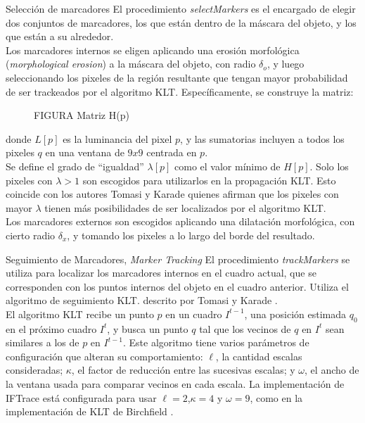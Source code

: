 \documentclass[a4paper,10pt]{article}
\begin{document}
Selección de marcadores
El procedimiento \textit{selectMarkers} es el encargado de elegir dos conjuntos 
de marcadores, los que están dentro de la máscara del objeto, y los que están a
su alrededor.\\

Los marcadores internos se eligen aplicando una erosión morfológica 
(\textit{morphological erosion}) a la máscara del objeto, con radio $\delta_{o}$, y 
luego seleccionando los pixeles de la región resultante que tengan mayor probabilidad
de ser trackeados por el algoritmo KLT. Específicamente, se construye la matriz:

 \begin{figure}[H]
        \caption{FIGURA Matriz H(p)}
        \label{fig:IFTrace-matrix-H}
\end{figure}

donde $L[p]$ es la luminancia del pixel $p$, y las sumatorias incluyen a todos los
pixeles $q$ en una ventana de $9x9$ centrada en $p$.\\
Se define el grado de ``igualdad'' $\lambda[p]$ como el valor mínimo de $H[p]$. 
Solo los pixeles con $\lambda > 1$ son escogidos para utilizarlos en la 
propagación KLT. Esto coincide con los autores Tomasi y Karade \cite{Tomasi91detectionand}
quienes afirman que los pixeles con mayor $\lambda$ tienen más posibilidades
de ser localizados por el algoritmo KLT.\\
Los marcadores externos son escogidos aplicando una dilatación morfológica, con 
cierto radio $\delta_{x}$, y tomando los pixeles a lo largo del borde del resultado.

Seguimiento de Marcadores, \textit{Marker Tracking}
El procedimiento \textit{trackMarkers} se utiliza para localizar los marcadores 
internos en el cuadro actual, que se corresponden con los puntos internos del objeto
en el cuadro anterior. Utiliza el algoritmo de seguimiento KLT. descrito por Tomasi y 
Karade \cite{Tomasi91detectionand}.\\
El algoritmo KLT recibe un punto $p$ en un cuadro $I^{t-1}$, una posición estimada 
$q_{0}$ en el próximo cuadro $I^{t}$, y busca un punto $q$ tal que los vecinos
de $q$ en $I^{t}$ sean similares a los de $p$ en $I^{t-1}$. Este algoritmo tiene
varios parámetros de configuración que alteran su comportamiento: $\ell$, la cantidad
escalas consideradas; $\kappa$, el factor de reducción entre las sucesivas escalas; y 
$\omega$, el ancho de la ventana usada para comparar vecinos en cada escala. 
La implementación de IFTrace está configurada para usar $\ell=2$,$\kappa=4$ y 
$\omega=9$, como en la implementación de KLT de Birchfield \cite{Birchfield-KLT-implementation}.\\
\end{document}
